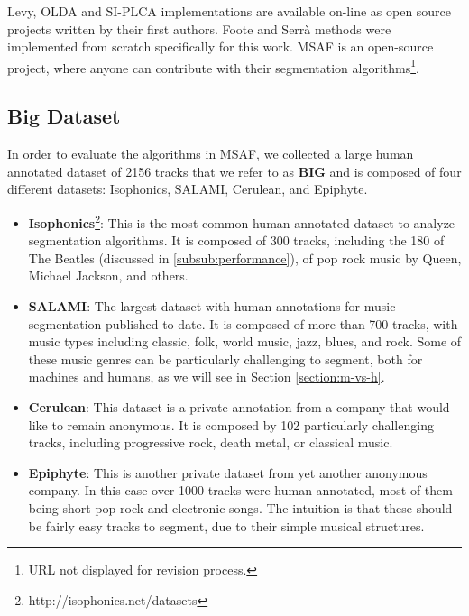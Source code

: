 \documentclass{article}
\begin{document}
Levy, OLDA and SI-PLCA implementations are available on-line as open source projects written by their first authors.
Foote and Serr\`a methods were implemented from scratch specifically for this work.
MSAF is an open-source project, where anyone can contribute with their segmentation algorithms\footnote{URL not displayed for revision process.}.

\subsection{Big Dataset}\label{sub:dataset}

In order to evaluate the algorithms in MSAF, we collected a large human annotated dataset of 2156 tracks that we refer to as \textbf{BIG} and is composed of four different datasets: Isophonics, SALAMI, Cerulean, and Epiphyte.

\begin{itemize}
  \item
    \textbf{Isophonics}\footnote{http://isophonics.net/datasets}: This is the most common human-annotated dataset to analyze segmentation algorithms. 
    It is composed of 300 tracks, including the 180 of The Beatles (discussed in \ref{subsub:performance}), of pop rock music by Queen, Michael Jackson, and others.

  \item
    \textbf{SALAMI}\cite{Smith2011}: The largest dataset with human-annotations for music segmentation published to date. 
    It is composed of more than 700 tracks, with music types including classic, folk, world music, jazz, blues, and rock.
    Some of these music genres can be particularly challenging to segment, both for machines and humans, as we will see in Section \ref{section:m-vs-h}.

  \item
    \textbf{Cerulean}: This dataset is a private annotation from a company that would like to remain anonymous.
    It is composed by 102 particularly challenging tracks, including progressive rock, death metal, or classical music.

  \item
    \textbf{Epiphyte}: This is another private dataset from yet another anonymous company.
    In this case over 1000 tracks were human-annotated, most of them being short pop rock and electronic songs.
    The intuition is that these should be fairly easy tracks to segment, due to their simple musical structures.

\end{itemize}
\end{document}
